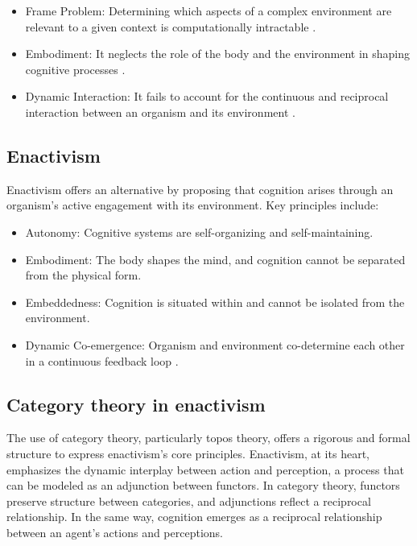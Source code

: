 \documentclass{article}
\begin{document}
\begin{itemize}
    \item Frame Problem: Determining which aspects of a complex environment are relevant to a given context is computationally intractable \cite{pylyshyn1987}.
    \item Embodiment: It neglects the role of the body and the environment in shaping cognitive processes \cite{clark1997}.
    \item Dynamic Interaction: It fails to account for the continuous and reciprocal interaction between an organism and its environment \cite{thompson2007}.
\end{itemize}

\subsection{Enactivism}

Enactivism offers an alternative by proposing that cognition arises through an organism's active engagement with its environment. Key principles include:

\begin{itemize} \item Autonomy: Cognitive systems are self-organizing and self-maintaining. \item Embodiment: The body shapes the mind, and cognition cannot be separated from the physical form. \item Embeddedness: Cognition is situated within and cannot be isolated from the environment. \item Dynamic Co-emergence: Organism and environment co-determine each other in a continuous feedback loop \cite{varela1991}. \end{itemize}

\subsection{Category theory in enactivism}
The use of category theory, particularly topos theory, offers a rigorous and formal structure to express enactivism's core principles. Enactivism, at its heart, emphasizes the dynamic interplay between action and perception, a process that can be modeled as an adjunction between functors. In category theory, functors preserve structure between categories, and adjunctions reflect a reciprocal relationship. In the same way, cognition emerges as a reciprocal relationship between an agent's actions and perceptions.
\end{document}
